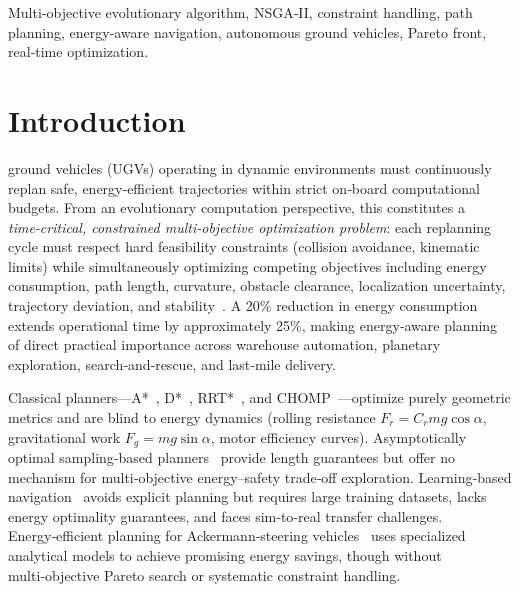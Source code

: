 \documentclass[lettersize,journal]{IEEEtran}
\begin{document}
\begin{IEEEkeywords}
Multi‑objective evolutionary algorithm, NSGA‑II, constraint handling,
path planning, energy‑aware navigation, autonomous ground vehicles,
Pareto front, real‑time optimization.
\end{IEEEkeywords}

\section{Introduction}
\label{sec:intro}

 ground vehicles (UGVs) operating in dynamic
environments must continuously replan safe, energy‑efficient trajectories
within strict on‑board computational budgets. From an evolutionary computation
perspective, this constitutes a \emph{time‑critical, constrained multi‑objective
optimization problem}: each replanning cycle must respect hard feasibility
constraints (collision avoidance, kinematic limits) while simultaneously
optimizing competing objectives including energy consumption, path length,
curvature, obstacle clearance, localization uncertainty, trajectory deviation,
and stability~\cite{Mei2005,Tokekar2014}. A 20\% reduction in energy consumption
extends operational time by approximately 25\%, making energy‑aware planning of
direct practical importance across warehouse automation, planetary exploration,
search‑and‑rescue, and last‑mile delivery.

Classical planners—A*~\cite{Hart1968}, D*~\cite{Stentz1995},
RRT*~\cite{Karaman2011}, and CHOMP~\cite{Ratliff2009}—optimize purely geometric
metrics and are blind to energy dynamics (rolling resistance $F_r = C_r m g
\cos\alpha$, gravitational work $F_g = mg\sin\alpha$, motor efficiency curves).
Asymptotically optimal sampling‑based planners~\cite{Gammell2021rrt} provide
length guarantees but offer no mechanism for multi‑objective energy–safety
trade‑off exploration. Learning‑based navigation~\cite{Xiao2022nav,Zhu2022drlnav,Lu2025icra}
avoids explicit planning but requires large training datasets, lacks energy
optimality guarantees, and faces sim‑to‑real transfer challenges.
Energy‑efficient planning for Ackermann‑steering vehicles~\cite{Zhang2023} uses
specialized analytical models to achieve promising energy savings, though without
multi‑objective Pareto search or systematic constraint handling.
\end{document}
